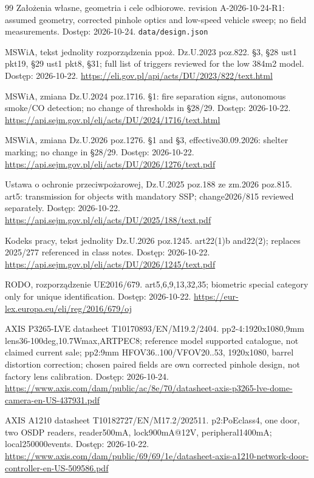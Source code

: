 \begin{thebibliography}{99}
 Założenia własne, geometria i cele odbiorowe. revision A-2026-10-24-R1: assumed geometry, corrected pinhole optics and low-speed vehicle sweep; no field measurements. Dostęp: 2026-10-24.
\texttt{data/design.json}

 MSWiA, tekst jednolity rozporządzenia ppoż. Dz.U.2023 poz.822. §3, §28 ust1 pkt19, §29 ust1 pkt8, §31; full list of triggers reviewed for the low 384m2 model. Dostęp: 2026-10-22.
\url{https://eli.gov.pl/api/acts/DU/2023/822/text.html}

 MSWiA, zmiana Dz.U.2024 poz.1716. §1: fire separation signs, autonomous smoke/CO detection; no change of thresholds in §28/29. Dostęp: 2026-10-22.
\url{https://api.sejm.gov.pl/eli/acts/DU/2024/1716/text.html}

 MSWiA, zmiana Dz.U.2026 poz.1276. §1 and §3, effective30.09.2026: shelter marking; no change in §28/29. Dostęp: 2026-10-22.
\url{https://api.sejm.gov.pl/eli/acts/DU/2026/1276/text.pdf}

 Ustawa o ochronie przeciwpożarowej, Dz.U.2025 poz.188 ze zm.2026 poz.815. art5: transmission for objects with mandatory SSP; change2026/815 reviewed separately. Dostęp: 2026-10-22.
\url{https://api.sejm.gov.pl/eli/acts/DU/2025/188/text.pdf}

 Kodeks pracy, tekst jednolity Dz.U.2026 poz.1245. art22(1)b and22(2); replaces 2025/277 referenced in class notes. Dostęp: 2026-10-22.
\url{https://api.sejm.gov.pl/eli/acts/DU/2026/1245/text.pdf}

 RODO, rozporządzenie UE2016/679. art5,6,9,13,32,35; biometric special category only for unique identification. Dostęp: 2026-10-22.
\url{https://eur-lex.europa.eu/eli/reg/2016/679/oj}

 AXIS P3265-LVE datasheet T10170893/EN/M19.2/2404. pp2-4:1920x1080,9mm lens36-100deg,10.7Wmax,ARTPEC8; reference model supported catalogue, not claimed current sale; pp2:9mm HFOV36..100/VFOV20..53, 1920x1080, barrel distortion correction; chosen paired fields are own corrected pinhole design, not factory lens calibration. Dostęp: 2026-10-24.
\url{https://www.axis.com/dam/public/ac/8e/70/datasheet-axis-p3265-lve-dome-camera-en-US-437931.pdf}

 AXIS A1210 datasheet T10182727/EN/M17.2/202511. p2:PoEclass4, one door, two OSDP readers, reader500mA, lock900mA@12V, peripheral1400mA; local250000events. Dostęp: 2026-10-22.
\url{https://www.axis.com/dam/public/69/69/1e/datasheet-axis-a1210-network-door-controller-en-US-509586.pdf}


\end{thebibliography}
